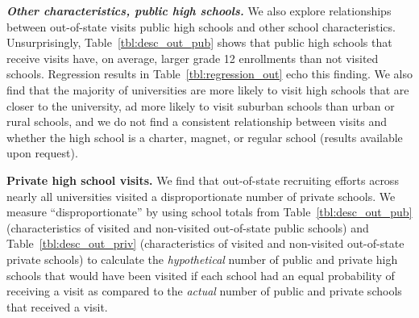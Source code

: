 \documentclass[twoside]{article}
\begin{document}
\textbf{\textit{Other characteristics, public high schools.}} We also explore relationships between out-of-state visits public high schools and other school characteristics. Unsurprisingly, Table~\ref{tbl:desc_out_pub} shows that public high schools that receive visits have, on average, larger grade 12 enrollments than not visited schools. Regression results in Table~\ref{tbl:regression_out} echo this finding. We also find that the majority of universities are more likely to visit high schools that are closer to the university, ad more likely to visit suburban schools than urban or rural schools, and we do not find a consistent relationship between visits and whether the high school is a charter, magnet, or regular school (results available upon request).


\textbf{Private high school visits.} We find that out-of-state recruiting efforts across nearly all universities visited a disproportionate number of private schools. We measure ``disproportionate'' by using school totals from Table~\ref{tbl:desc_out_pub} (characteristics of visited and non-visited out-of-state public schools) and Table~\ref{tbl:desc_out_priv} (characteristics of visited and non-visited out-of-state private schools) to calculate the \textit{hypothetical} number of public and private high schools that would have been visited if each school had an equal probability of receiving a visit as compared to the \textit{actual} number of public and private schools that received a visit. 




\end{document}
